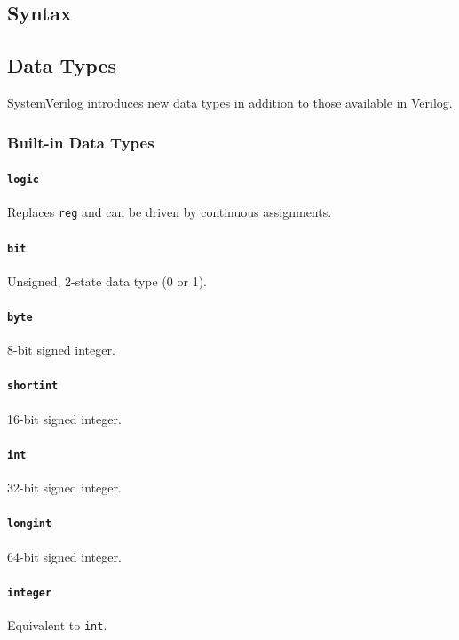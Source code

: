 \subsection{Syntax}

\subsection{Data Types}
SystemVerilog introduces new data types in addition to those available in Verilog.

\subsubsection{Built-in Data Types}
\paragraph{\texttt{logic}} Replaces \texttt{reg} and can be driven by continuous assignments.

\paragraph{\texttt{bit}} Unsigned, 2-state data type (0 or 1).

\paragraph{\texttt{byte}} 8-bit signed integer.

\paragraph{\texttt{shortint}} 16-bit signed integer.

\paragraph{\texttt{int}} 32-bit signed integer.

\paragraph{\texttt{longint}} 64-bit signed integer.

\paragraph{\texttt{integer}} Equivalent to \texttt{int}.

